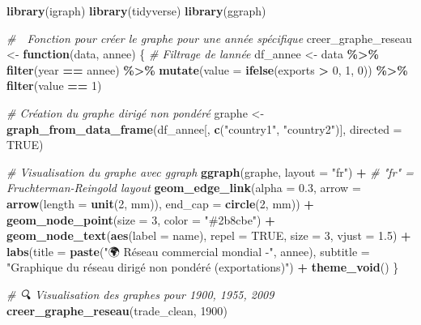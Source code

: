 \documentclass[
]{article}
\newenvironment{Shaded}{\begin{snugshade}}{\end{snugshade}}
\newcommand{\AttributeTok}[1]{\textcolor[rgb]{0.13,0.29,0.53}{#1}}
\newcommand{\CommentTok}[1]{\textcolor[rgb]{0.56,0.35,0.01}{\textit{#1}}}
\newcommand{\ConstantTok}[1]{\textcolor[rgb]{0.56,0.35,0.01}{#1}}
\newcommand{\ControlFlowTok}[1]{\textcolor[rgb]{0.13,0.29,0.53}{\textbf{#1}}}
\newcommand{\DecValTok}[1]{\textcolor[rgb]{0.00,0.00,0.81}{#1}}
\newcommand{\FloatTok}[1]{\textcolor[rgb]{0.00,0.00,0.81}{#1}}
\newcommand{\FunctionTok}[1]{\textcolor[rgb]{0.13,0.29,0.53}{\textbf{#1}}}
\newcommand{\NormalTok}[1]{#1}
\newcommand{\OtherTok}[1]{\textcolor[rgb]{0.56,0.35,0.01}{#1}}
\newcommand{\SpecialCharTok}[1]{\textcolor[rgb]{0.81,0.36,0.00}{\textbf{#1}}}
\newcommand{\StringTok}[1]{\textcolor[rgb]{0.31,0.60,0.02}{#1}}
\begin{document}
\begin{Shaded}
\begin{Highlighting}[]
\FunctionTok{library}\NormalTok{(igraph)}
\FunctionTok{library}\NormalTok{(tidyverse)}
\FunctionTok{library}\NormalTok{(ggraph)}

\CommentTok{\# 🔁 Fonction pour créer le graphe pour une année spécifique}
\NormalTok{creer\_graphe\_reseau }\OtherTok{\textless{}{-}} \ControlFlowTok{function}\NormalTok{(data, annee) \{}
  \CommentTok{\# Filtrage de l\textquotesingle{}année}
\NormalTok{  df\_annee }\OtherTok{\textless{}{-}}\NormalTok{ data }\SpecialCharTok{\%\textgreater{}\%}
    \FunctionTok{filter}\NormalTok{(year }\SpecialCharTok{==}\NormalTok{ annee) }\SpecialCharTok{\%\textgreater{}\%}
    \FunctionTok{mutate}\NormalTok{(}\AttributeTok{value =} \FunctionTok{ifelse}\NormalTok{(exports }\SpecialCharTok{\textgreater{}} \DecValTok{0}\NormalTok{, }\DecValTok{1}\NormalTok{, }\DecValTok{0}\NormalTok{)) }\SpecialCharTok{\%\textgreater{}\%}
    \FunctionTok{filter}\NormalTok{(value }\SpecialCharTok{==} \DecValTok{1}\NormalTok{)}
  
  \CommentTok{\# Création du graphe dirigé non pondéré}
\NormalTok{  graphe }\OtherTok{\textless{}{-}} \FunctionTok{graph\_from\_data\_frame}\NormalTok{(df\_annee[, }\FunctionTok{c}\NormalTok{(}\StringTok{"country1"}\NormalTok{, }\StringTok{"country2"}\NormalTok{)], }\AttributeTok{directed =} \ConstantTok{TRUE}\NormalTok{)}
  
  \CommentTok{\# Visualisation du graphe avec ggraph}
  \FunctionTok{ggraph}\NormalTok{(graphe, }\AttributeTok{layout =} \StringTok{"fr"}\NormalTok{) }\SpecialCharTok{+}  \CommentTok{\# "fr" = Fruchterman{-}Reingold layout}
    \FunctionTok{geom\_edge\_link}\NormalTok{(}\AttributeTok{alpha =} \FloatTok{0.3}\NormalTok{, }\AttributeTok{arrow =} \FunctionTok{arrow}\NormalTok{(}\AttributeTok{length =} \FunctionTok{unit}\NormalTok{(}\DecValTok{2}\NormalTok{, }\StringTok{\textquotesingle{}mm\textquotesingle{}}\NormalTok{)), }\AttributeTok{end\_cap =} \FunctionTok{circle}\NormalTok{(}\DecValTok{2}\NormalTok{, }\StringTok{\textquotesingle{}mm\textquotesingle{}}\NormalTok{)) }\SpecialCharTok{+}
    \FunctionTok{geom\_node\_point}\NormalTok{(}\AttributeTok{size =} \DecValTok{3}\NormalTok{, }\AttributeTok{color =} \StringTok{"\#2b8cbe"}\NormalTok{) }\SpecialCharTok{+}
    \FunctionTok{geom\_node\_text}\NormalTok{(}\FunctionTok{aes}\NormalTok{(}\AttributeTok{label =}\NormalTok{ name), }\AttributeTok{repel =} \ConstantTok{TRUE}\NormalTok{, }\AttributeTok{size =} \DecValTok{3}\NormalTok{, }\AttributeTok{vjust =} \FloatTok{1.5}\NormalTok{) }\SpecialCharTok{+}
    \FunctionTok{labs}\NormalTok{(}\AttributeTok{title =} \FunctionTok{paste}\NormalTok{(}\StringTok{"🌍 Réseau commercial mondial {-}"}\NormalTok{, annee),}
         \AttributeTok{subtitle =} \StringTok{"Graphique du réseau dirigé non pondéré (exportations)"}\NormalTok{) }\SpecialCharTok{+}
    \FunctionTok{theme\_void}\NormalTok{()}
\NormalTok{\}}

\CommentTok{\# 🔍 Visualisation des graphes pour 1900, 1955, 2009}
\FunctionTok{creer\_graphe\_reseau}\NormalTok{(trade\_clean, }\DecValTok{1900}\NormalTok{)}
\end{Highlighting}
\end{Shaded}
\end{document}
